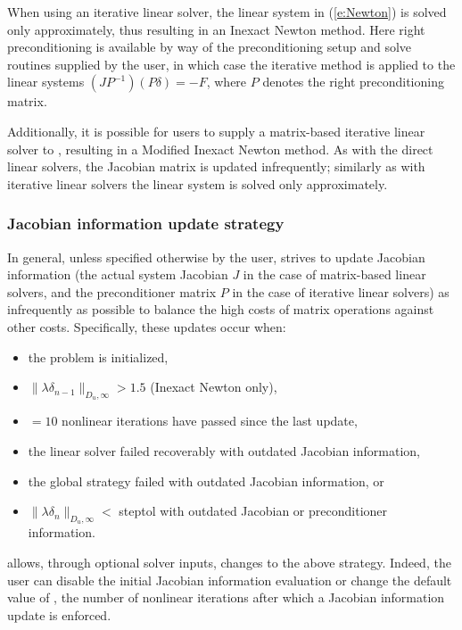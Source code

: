 When using an iterative linear solver, the linear system in (\ref{e:Newton}) is
solved only approximately, thus resulting in an Inexact Newton method. Here
right preconditioning is available by way of the preconditioning setup and solve
routines supplied by the user, in which case the iterative method is applied to
the linear systems $(JP^{-1})(P\delta) = -F$, where $P$ denotes the right
preconditioning matrix.

Additionally, it is possible for users to supply a matrix-based
iterative linear solver to {\kinsol}, resulting in a Modified Inexact
Newton method.  As with the direct linear solvers, the Jacobian matrix
is updated infrequently; similarly as with iterative linear solvers
the linear system is solved only approximately.


\subsubsection*{Jacobian information update strategy}
\label{ss:JacUpdate}
In general, unless specified otherwise by the user, {\kinsol} strives to update
Jacobian information (the actual system Jacobian $J$ in the case of matrix-based linear
solvers, and the preconditioner matrix $P$ in the case of iterative linear solvers)
as infrequently as possible to balance the high costs of matrix operations against
other costs. Specifically, these updates occur when:
\begin{itemize}
\item the problem is initialized,
\item $\|\lambda\delta_{n-1}\|_{D_u,\infty} > 1.5$ (Inexact Newton only),
\item {}$=10$ nonlinear iterations have passed since the last update,
\item the linear solver failed recoverably with outdated Jacobian information,
\item the global strategy failed with outdated Jacobian information, or
\item $\|\lambda\delta_{n}\|_{D_u,\infty} < $ {\sc steptol} with
  outdated Jacobian or preconditioner information.
\end{itemize}
{\kinsol} allows, through optional solver inputs, changes to the above strategy.
Indeed, the user can disable the initial Jacobian information evaluation or change
the default value of , the number of nonlinear iterations after which a
Jacobian information update is enforced.

